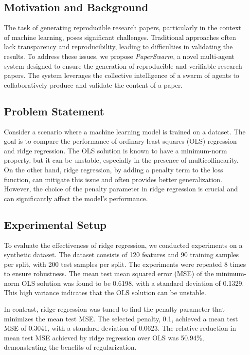 \subsection{Motivation and Background}

The task of generating reproducible research papers, particularly in the context of machine learning, poses significant challenges. Traditional approaches often lack transparency and reproducibility, leading to difficulties in validating the results. To address these issues, we propose \textit{PaperSwarm}, a novel multi-agent system designed to ensure the generation of reproducible and verifiable research papers. The system leverages the collective intelligence of a swarm of agents to collaboratively produce and validate the content of a paper.

\subsection{Problem Statement}

Consider a scenario where a machine learning model is trained on a dataset. The goal is to compare the performance of ordinary least squares (OLS) regression and ridge regression. The OLS solution is known to have a minimum-norm property, but it can be unstable, especially in the presence of multicollinearity. On the other hand, ridge regression, by adding a penalty term to the loss function, can mitigate this issue and often provides better generalization. However, the choice of the penalty parameter in ridge regression is crucial and can significantly affect the model's performance.

\subsection{Experimental Setup}

To evaluate the effectiveness of ridge regression, we conducted experiments on a synthetic dataset. The dataset consists of 120 features and 90 training samples per split, with 200 test samples per split. The experiments were repeated 8 times to ensure robustness. The mean test mean squared error (MSE) of the minimum-norm OLS solution was found to be 0.6198, with a standard deviation of 0.1329. This high variance indicates that the OLS solution can be unstable.

In contrast, ridge regression was tuned to find the penalty parameter that minimizes the mean test MSE. The selected penalty, 0.1, achieved a mean test MSE of 0.3041, with a standard deviation of 0.0623. The relative reduction in mean test MSE achieved by ridge regression over OLS was 50.94\%, demonstrating the benefits of regularization.

